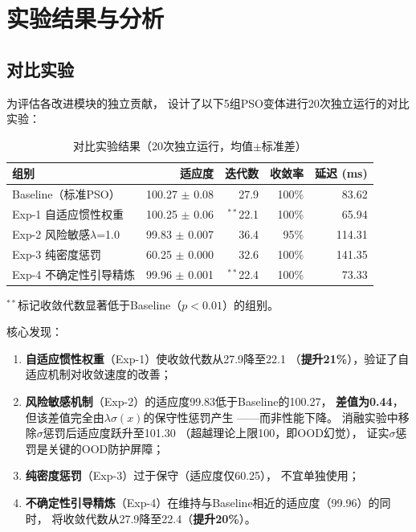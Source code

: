 \section{实验结果与分析}

\subsection{对比实验}

为评估各改进模块的独立贡献，
设计了以下5组PSO变体进行20次独立运行的对比实验：

\begin{table}[H]
\centering
\caption{对比实验结果（20次独立运行，均值$\pm$标准差）}
\begin{tabular}{lrrrr}
\toprule
组别 & 适应度 & 迭代数 & 收敛率 & 延迟 (ms) \\
\midrule
Baseline（标准PSO） & 100.27 $\pm$ 0.08 & 27.9 & 100\% & 83.62 \\
Exp-1 自适应惯性权重 & 100.25 $\pm$ 0.06 & $^{**}$22.1 & 100\% & 65.94 \\
Exp-2 风险敏感$\lambda$=1.0 & 99.83 $\pm$ 0.007 & 36.4 & 95\% & 114.31 \\
Exp-3 纯密度惩罚 & 60.25 $\pm$ 0.000 & 32.6 & 100\% & 141.35 \\
Exp-4 不确定性引导精炼 & 99.96 $\pm$ 0.001 & $^{**}$22.4 & 100\% & 73.33 \\
\bottomrule
\end{tabular}
\label{tab:comparison}
\end{table}

$^{**}$标记收敛代数显著低于Baseline（$p < 0.01$）的组别。

核心发现：
\begin{enumerate}
    \item \textbf{自适应惯性权重}（Exp-1）使收敛代数从27.9降至22.1
        （\textbf{提升21\%}），验证了自适应机制对收敛速度的改善；
    \item \textbf{风险敏感机制}（Exp-2）的适应度99.83低于Baseline的100.27，
        \textbf{差值为0.44}，但该差值完全由$\lambda\sigma(x)$的保守性惩罚产生
        ——而非性能下降。
        消融实验中移除$\sigma$惩罚后适应度跃升至101.30
        （超越理论上限100，即OOD幻觉），
        证实$\sigma$惩罚是关键的OOD防护屏障；
    \item \textbf{纯密度惩罚}（Exp-3）过于保守（适应度仅60.25），
        不宜单独使用；
    \item \textbf{不确定性引导精炼}（Exp-4）在维持与Baseline相近的适应度（99.96）的同时，
        将收敛代数从27.9降至22.4（\textbf{提升20\%}）。
\end{enumerate}

